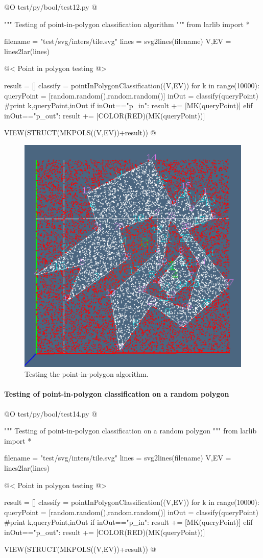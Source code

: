 \documentclass[11pt,oneside]{article}    %
\begin{document}
@O test/py/bool/test12.py @{
""" Testing of point-in-polygon classification algorithm """
from larlib import *

filename = "test/svg/inters/tile.svg"
lines = svg2lines(filename)
V,EV = lines2lar(lines)

@< Point in polygon testing @>

result = []
classify = pointInPolygonClassification((V,EV))
for k in range(10000):
    queryPoint = [random.random(),random.random()]
    inOut = classify(queryPoint)
    #print k,queryPoint,inOut
    if inOut=="p_in": result += [MK(queryPoint)]
    elif inOut=="p_out": result += [COLOR(RED)(MK(queryPoint))]

VIEW(STRUCT(MKPOLS((V,EV))+result))
@}

\begin{figure}[htbp] %
   \centering
   \includegraphics[width=0.5\linewidth]{images/pointInPolygon} 
   \caption{Testing the point-in-polygon algorithm.}
   \label{fig:pointInPolygon}
\end{figure}


\paragraph{Testing of point-in-polygon classification on a random polygon}

@O test/py/bool/test14.py @{
""" Testing of point-in-polygon classification  on a random polygon """
from larlib import *

filename = "test/svg/inters/tile.svg"
lines = svg2lines(filename)
V,EV = lines2lar(lines)

@< Point in polygon testing @>

result = []
classify = pointInPolygonClassification((V,EV))
for k in range(10000):
    queryPoint = [random.random(),random.random()]
    inOut = classify(queryPoint)
    #print k,queryPoint,inOut
    if inOut=="p_in": result += [MK(queryPoint)]
    elif inOut=="p_out": result += [COLOR(RED)(MK(queryPoint))]

VIEW(STRUCT(MKPOLS((V,EV))+result))
@}
\end{document}
